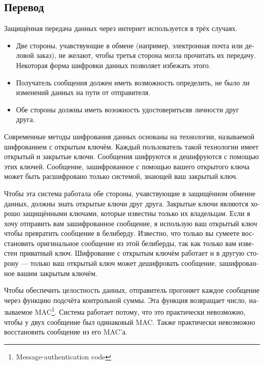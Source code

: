 \documentclass[a5paper,10pt,notitlepage,pdftex,headsepline]{scrartcl}
\begin{document}
  \subsection{Перевод}
    \begin{otherlanguage}{russian}
      Защищённая передача данных через интернет используется в трёх случаях.
      \begin{itemize}
        \item Две стороны, учавствующие в обмене (например, электронная почта
          или деловой заказ), не желают, чтобы третья сторона могла
          прочитать их передачу.
          Некоторая форма шифровки данных позволяет избежать этого.
        \item Получатель сообщения должен иметь возможность определить, не
          было ли изменений данных на пути от отправителя.
        \item Обе стороны должны иметь возожность удостоверитьсяв личности
          друг друга.
      \end{itemize}

      Современные методы шифрования данных основаны на технологии,
      называемой шифрованием с открытым ключём.
      Каждый пользователь такой технологии имеет открытый и закрытые ключи.
      Сообщения шифруются и дешифруются с помощью этих ключей.
      Сообщение, зашифрованное с помощью вашего открытого ключа может быть
      расшифровано только системой, знающей ваш закрытый ключ.

      Чтобы эта система работала обе стороны, учавствующие в защищённом
      обменне данных, должны знать открытые ключи друг друга.
      Закрытые ключи являются хорошо защищёнными ключами, которые известны
      только их владельцам.
      Если я хочу отправить вам зашифрованное сообщение, я использую ваш
      открытый ключ чтобы превратить сообщение в белиберду.
      Известно, что только вы сумеете восстановить оригинальное сообщение из
      этой белиберды, так как только вам известен приватный ключ.
      Шифрование с открытым ключём работает и в другую сторону --- только
      ваш открытый ключ может дешифровать сообщение, зашифрованное вашим
      закрытым ключём.

      Чтобы обеспечить целостность данных, отправитель прогоняет каждое
      сообщение через функцию подсчёта контрольной суммы.
      Эта функция возвращает число, называемое
      MAC\footnote{Message-authentication code}.
      Система работает потому, что это практически невозможно, чтобы у
      двух сообщение был одинаковый MAC.
      Также практически невозможно восстановить сообщение из его MAC'а.


\end{otherlanguage}
\end{document}
